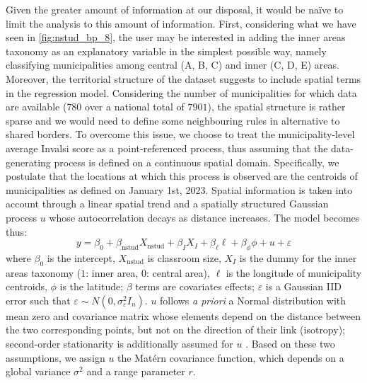 \documentclass{book}
\begin{document}
Given the greater amount of information at our disposal, it would be na{\"i}ve to limit the analysis to this amount of information. First, considering what we have seen in \ref{fig:nstud_bp_8}, the user may be interested in adding the inner areas taxonomy as an explanatory variable in the simplest possible way, namely classifying municipalities among central (A, B, C) and inner (C, D, E) areas. Moreover, the territorial structure of the dataset suggests to include spatial terms in the regression model. Considering the number of municipalities for which data are available ($780$ over a national total of $7901$), the spatial structure is rather sparse and we would need to define some neighbouring rules in alternative to shared borders. To overcome this issue, we choose to treat the municipality-level average Invalsi score as a point-referenced process, thus assuming that the data-generating process is defined on a continuous spatial domain. Specifically, we postulate that the locations at which this process is observed are the centroids of municipalities as defined on January 1st, 2023.
Spatial information is taken into account through a linear spatial trend and a spatially structured Gaussian process $u$ whose autocorrelation decays as distance increases. The model becomes thus:
%
\begin{equation}
y = \beta_0 + \beta_\mathrm{nstud} X_\mathrm{nstud} + \beta_{I} X_{I} + \beta_{\ell} \ell +\beta_{\phi} \phi + u + \varepsilon
\label{eq:spde}
\end{equation}
%
where $\beta_0$ is the intercept, $X_\mathrm{nstud}$ is classroom size, $X_I$ is the dummy for the inner areas taxonomy ($1$: inner area, $0$: central area), $\ell$ is the longitude of municipality centroids, $\phi$ is the latitude; $\beta$ terms are covariates effects; $\varepsilon$ is a Gaussian IID error such that $\varepsilon \sim N  (0, \sigma_{\varepsilon}^2 I_n)$. $u$ follows \textit{a priori} a Normal distribution with mean zero and covariance matrix whose elements depend on the distance between the two corresponding points, but not on the direction of their link (isotropy); second-order stationarity is additionally assumed for $u$ \citep[][ Section 2.1]{Banerjee}. Based on these two assumptions, we assign $u$ the Matérn covariance function, which depends on a global variance $\sigma^2$ and a range parameter $r$.
\end{document}
